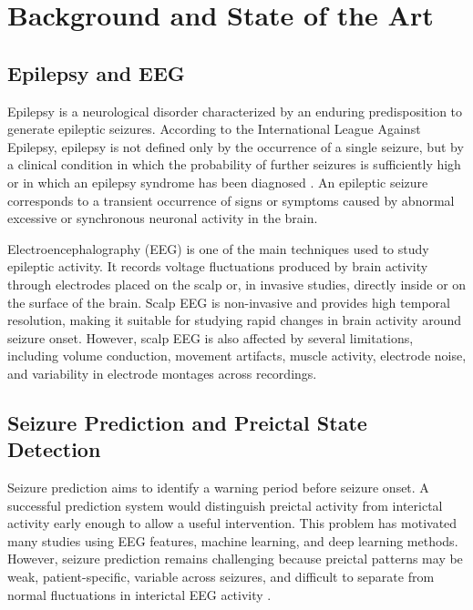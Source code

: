 \chapter{Background and State of the Art}
\label{chap:background-state-of-art}

\section{Epilepsy and EEG}
\label{sec:background-epilepsy-eeg}

Epilepsy is a neurological disorder characterized by an enduring predisposition
to generate epileptic seizures. According to the International League Against
Epilepsy, epilepsy is not defined only by the occurrence of a single seizure,
but by a clinical condition in which the probability of further seizures is
sufficiently high or in which an epilepsy syndrome has been diagnosed
\cite{Fisher2014}. An epileptic seizure corresponds to a transient occurrence
of signs or symptoms caused by abnormal excessive or synchronous neuronal
activity in the brain.

Electroencephalography (EEG) is one of the main techniques used to study
epileptic activity. It records voltage fluctuations produced by brain activity
through electrodes placed on the scalp or, in invasive studies, directly inside
or on the surface of the brain. Scalp EEG is non-invasive and provides high
temporal resolution, making it suitable for studying rapid changes in brain
activity around seizure onset. However, scalp EEG is also affected by several
limitations, including volume conduction, movement artifacts, muscle activity,
electrode noise, and variability in electrode montages across recordings.

\section{Seizure Prediction and Preictal State Detection}
\label{sec:background-seizure-prediction}

Seizure prediction aims to identify a warning period before seizure onset. A
successful prediction system would distinguish preictal activity from interictal
activity early enough to allow a useful intervention. This problem has motivated
many studies using EEG features, machine learning, and deep learning methods.
However, seizure prediction remains challenging because preictal patterns may be
weak, patient-specific, variable across seizures, and difficult to separate from
normal fluctuations in interictal EEG activity \cite{Mormann2007,Kuhlmann2018}.

